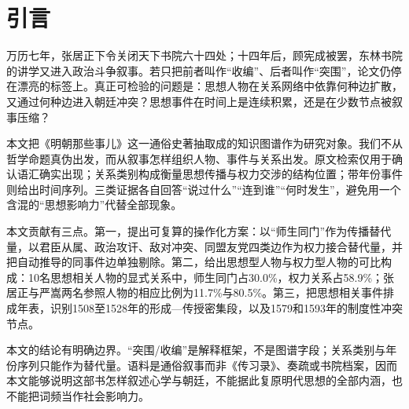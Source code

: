 \section{引言}

万历七年，张居正下令关闭天下书院六十四处；十四年后，顾宪成被罢，东林书院的讲学又进入政治斗争叙事。若只把前者叫作“收编”、后者叫作“突围”，论文仍停在漂亮的标签上。真正可检验的问题是：思想人物在关系网络中依靠何种边扩散，又通过何种边进入朝廷冲突？思想事件在时间上是连续积累，还是在少数节点被叙事压缩？

本文把《明朝那些事儿》这一通俗史著抽取成的知识图谱作为研究对象。我们不从哲学命题真伪出发，而从叙事怎样组织人物、事件与关系出发。原文检索仅用于确认语汇确实出现；关系类别构成衡量思想传播与权力交涉的结构位置；带年份事件则给出时间序列。三类证据各自回答“说过什么”“连到谁”“何时发生”，避免用一个含混的“思想影响力”代替全部现象。

本文贡献有三点。第一，提出可复算的操作化方案：以“师生同门”作为传播替代量，以君臣从属、政治攻讦、敌对冲突、同盟友党四类边作为权力接合替代量，并把自动推导的同事件边单独剔除。第二，给出思想型人物与权力型人物的可比构成：10名思想相关人物的显式关系中，师生同门占30.0\%，权力关系占58.9\%；张居正与严嵩两名参照人物的相应比例为11.7\%与80.5\%。第三，把思想相关事件排成年表，识别1508至1528年的形成—传授密集段，以及1579和1593年的制度性冲突节点。

本文的结论有明确边界。“突围/收编”是解释框架，不是图谱字段；关系类别与年份序列只能作为替代量。语料是通俗叙事而非《传习录》、奏疏或书院档案，因而本文能够说明这部书怎样叙述心学与朝廷，不能据此复原明代思想的全部内涵，也不能把词频当作社会影响力。
